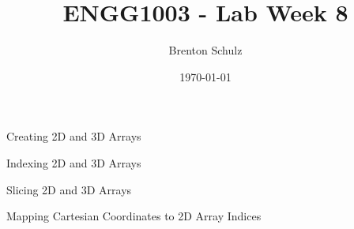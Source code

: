 \documentclass{lab}
\title{ENGG1003 - Lab Week 8}
\author{Brenton Schulz}
\date{\today}
\begin{document}
\maketitle

\begin{task}{}{}

\end{task}

\begin{task}{Creating 2D and 3D Arrays}{}

\end{task}

\begin{task}{Indexing 2D and 3D Arrays}{}

\end{task}

\begin{task}{Slicing 2D and 3D Arrays}{}

\end{task}

\begin{task}{Mapping Cartesian Coordinates to 2D Array Indices}{}

\end{task}
\end{document}
